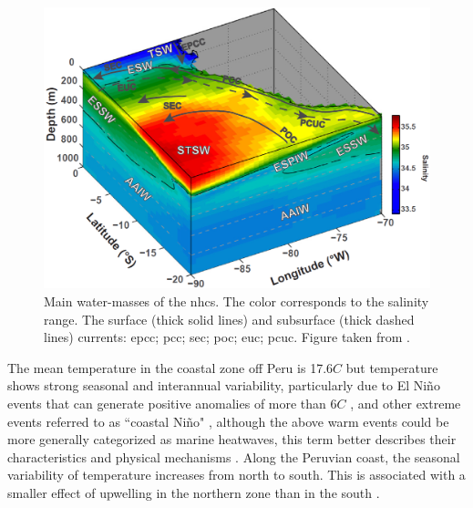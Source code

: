 \begin{figure}[ht]
	\includegraphics[width=1.0\textwidth]{figures/Chap1WaterMassesNHCS.png}
	\centering
	\caption{Main water-masses of the \acrshort{nhcs}. The color corresponds to the salinity range. The surface (thick solid lines) and subsurface (thick dashed lines) currents: \acrfull{epcc}; \acrfull{pcc}; \acrfull{sec}; \acrfull{poc}; \acrfull{euc}; \acrfull{pcuc}. Figure taken from \cite{GradChai2018}.}
	\label{Chap1WaterMassesNHCS}
\end{figure}

The mean temperature in the coastal zone off Peru is 17.6\textdegree $C$ \citep{MontPurc2003} but temperature shows strong seasonal and interannual variability, particularly due to El Ni\~{n}o events that can generate positive anomalies of more than 6\textdegree $C$  \citep{BraiMcla1987,SancCali2000,CaiBorl2014,CaiWang2017,CaiWang2018,FreuHenl2019}, and other extreme events referred to as ``coastal Ni\~{n}o" \citep{EcheCola2018,Garr2018,HuHuan2019,RodrDiaz2019,TakaMart2019}, although the above warm events could be more generally categorized as marine heatwaves, this term better describes their characteristics and physical mechanisms \citep{PietCola2021}. Along the Peruvian coast, the seasonal variability of temperature increases from north to south. This is associated with a smaller effect of upwelling in the northern zone than in the south \citep{BraiMcla1987}.\\

